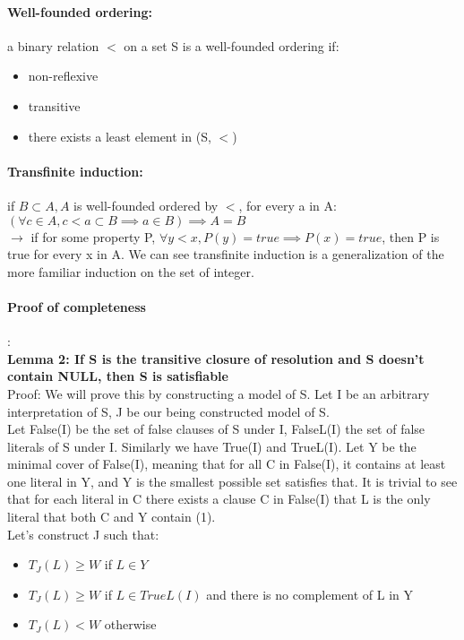 \documentclass[part1.tex]{subfiles}
\begin{document}
\paragraph{Well-founded ordering:} a binary relation \(<\) on a set S is a well-founded ordering if:
\begin{itemize}
	\item non-reflexive
	\item transitive
	\item there exists a least element in (S, \(<\))
\end{itemize}
\paragraph{Transfinite induction:} if \(B \subset A, A\) is well-founded ordered by \(<\), for every a in A:\\
\(({\forall c \in A, c < a} \subset B \implies a \in B) \implies A = B\)\\
\(\to\) if for some property P, \(\forall y < x, P(y) = true \implies P(x) = true\), then P is true for 
every x in A.
We can see transfinite induction is a generalization of the more familiar induction on the set of integer.\\
\paragraph{Proof of completeness}:\\
{\bfseries Lemma 2: If S is the transitive closure of resolution and S doesn't contain NULL, then S is
satisfiable\\}
Proof: We will prove this by constructing a model of S. Let I be an arbitrary interpretation of S, J be
our being constructed model of S.\\
Let False(I) be the set of false clauses of S under I, FalseL(I) the set of false literals of S under I.
Similarly we have True(I) and TrueL(I).
Let Y be the minimal cover of False(I), meaning that for all C in False(I), it contains at least one 
literal in Y, and Y is the smallest possible set satisfies that. It is trivial to see that for each 
literal in C there exists a clause C in False(I) that L is the only literal that both C and Y contain
(1).\\

Let's construct J such that:
\begin{itemize}
	\item \(T_J(L) \ge W \) if \(L \in Y\)
	\item \(T_J(L) \ge W \) if \(L \in TrueL(I)\) and there is no complement of L in Y
	\item \(T_J(L) < W\) otherwise
\end{itemize}
\end{document}
